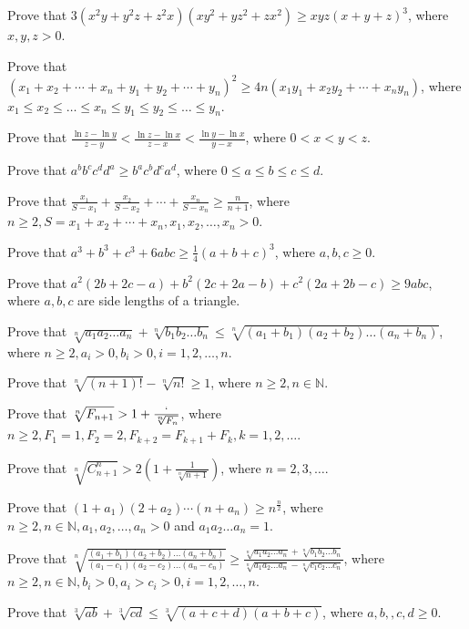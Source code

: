 \item Prove that $3(x^2y + y^2z + z^2x)(xy^2 + yz^2 + zx^2)\geq xyz(x + y + z)^3$, where $x, y, z > 0$.
\item Prove that $(x_1 + x_2 + \cdots + x_n + y_1 + y_2 + \cdots + y_n)^2 \geq 4n(x_1y_1 + x_2y_2 + \cdots + x_ny_n)$, where
  $x_1\leq x_2\leq\ldots\leq x_n\leq y_1\leq y_2\leq\ldots\leq y_n$.
\item Prove that $\frac{\ln z - \ln y}{z - y} < \frac{\ln z - \ln x}{z - x} < \frac{\ln y - \ln x}{y - x}$, where $0 < x < y < z$.
\item Prove that $a^bb^cc^dd^a\geq b^ac^bd^ca^d$, where $0\leq a\leq b\leq c\leq d$.
\item Prove that $\frac{x_1}{S - x_1} + \frac{x_2}{S - x_2} + \cdots + \frac{x_n}{S - x_n}\geq \frac{n}{n + 1}$, where $n\geq 2, S
  = x_1 + x_2 + \cdots + x_n, x_1, x_2, \ldots, x_n > 0$.
\item Prove that $a^3 + b^3 + c^3 + 6abc \geq \frac{1}{4}(a + b + c)^3$, where $a, b, c\geq 0$.
\item Prove that $a^2(2b + 2c - a) + b^2(2c + 2a - b) + c^2(2a + 2b - c)\geq 9abc$, where $a, b, c$ are side lengths of a triangle.
\item Prove that $\sqrt[n]{a_1a_2\ldots a_n} + \sqrt[n]{b_1b_2\ldots b_n} \leq \sqrt[n]{(a_1 + b_1)(a_2 + b_2)\ldots(a_n + b_n)}$,
  where $n\geq 2, a_i > 0, b_i > 0, i = 1, 2, \ldots, n$.
\item Prove that $\sqrt[n]{(n + 1)!} - \sqrt[n]{n!}\geq 1$, where $n\geq 2, n\in\mathbb{N}$.
\item Prove that $\sqrt[n]{F_{n + 1}} > 1 + \frac{`}{\sqrt[n]{F_n}}$, where $n\geq 2, F_1 = 1, F_2 = 2, F_{k + 2} = F_{k+1} + F_k,
  k = 1, 2, \ldots$.
\item Prove that $\sqrt[n]{C_{n+1}^n} > 2\left(1 + \frac{1}{\sqrt[n]{n + 1}}\right)$, where $n = 2, 3, \ldots$.
\item Prove that $(1 + a_1)(2 + a_2)\cdots(n + a_n)\geq n^{\frac{n}{2}}$, where $n\geq 2, n\in\mathbb{N}, a_1, a_2, \ldots, a_n >
  0$ and $a_1a_2\ldots a_n = 1$.
\item Prove that $\sqrt[n]{\frac{(a_1 + b_1)(a_2 + b_2)\ldots(a_n + b_n)}{(a_1 - c_1)(a_2 - c_2)\ldots(a_n - c_n)}}\geq
  \frac{\sqrt[n]{a_1a_2\ldots a_n} + \sqrt[n]{b_1b_2\ldots b_n}}{\sqrt[n]{a_1a_2\ldots a_n} - \sqrt[n]{c_1c_2\ldots c_n}}$, where
  $n\geq 2, n\in\mathbb{N}, b_i > 0, a_i > c_i > 0, i = 1, 2, \ldots, n$.
\item Prove that $\sqrt[3]{ab} + \sqrt[3]{cd}\leq \sqrt[3]{(a + c + d)(a + b + c)}$, where $a, b, ,c, d\geq 0$.
